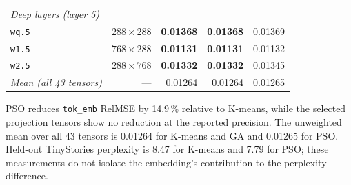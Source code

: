 \begin{table}[t]
\begin{tabular}{lrrrr}
\midrule
\multicolumn{5}{l}{\textit{Deep layers (layer 5)}} \\
\quad\texttt{wq.5}              & $288\times288$   & \textbf{0.01368} & \textbf{0.01368} & 0.01369 \\
\quad\texttt{w1.5}              & $768\times288$   & \textbf{0.01131} & \textbf{0.01131} & 0.01132 \\
\quad\texttt{w2.5}              & $288\times768$   & \textbf{0.01332} & \textbf{0.01332} & 0.01345 \\
\midrule
\textit{Mean (all 43 tensors)} & — & 0.01264 & 0.01264 & 0.01265 \\
\bottomrule
\end{tabular}
%
\smallskip
\begin{minipage}{0.95\columnwidth}
  \footnotesize
  PSO reduces \texttt{tok\_emb} RelMSE by 14.9\,\% relative to K-means,
  while the selected projection tensors show no reduction at the reported
  precision. The unweighted mean over all 43 tensors is 0.01264 for K-means
  and GA and 0.01265 for PSO. Held-out TinyStories perplexity is 8.47 for
  K-means and 7.79 for PSO; these measurements do not isolate the embedding's
  contribution to the perplexity difference.
\end{minipage}
\end{table}
